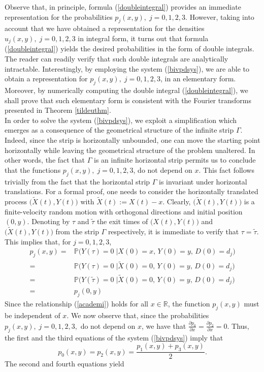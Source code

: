 \documentclass{article}
\begin{document}
Observe that, in principle, formula (\ref{doubleintegral}) provides an immediate representation for the probabilities $p_j(x,y),\;j=0,1,2,3$. However, taking into account that we have obtained a representation for the densities $u_j(x,y),\;j=0,1,2,3$ in integral form, it turns out that formula (\ref{doubleintegral}) yields the desired probabilities in the form of double integrals. The reader can readily verify that such double integrals are analytically intractable. Interestingly, by employing the system (\ref{bivpdsys}), we are able to obtain a representation for $p_j(x,y),\;j=0,1,2,3$, in an elementary form. Moreover, by numerically computing the double integral (\ref{doubleintegral}), we shall prove that such elementary form is consistent with the Fourier transforms presented in Theorem \ref{tildeuthm}.\\
In order to solve the system (\ref{bivpdsys}), we exploit a simplification which emerges as a consequence of the geometrical structure of the infinite strip $\Gamma$. Indeed, since the strip is horizontally unbounded, one can move the starting point horizontally while leaving the geometrical structure of the problem unaltered. In other words, the fact that $\Gamma$ is an infinite horizontal strip permits us to conclude that the functions $p_j(x,y),\;j=0,1,2,3$, do not depend on $x$. This fact follows trivially from the fact that the horizontal strip $\Gamma$ is invariant under horizontal translations. For a formal proof, one needs to consider the horizontally translated process $\big(\widetilde{X}(t), Y(t)\big)$ with $\widetilde{X}(t):=X(t)-x$. Clearly, $\big(\widetilde{X}(t), Y(t)\big)$ is a finite-velocity random motion with orthogonal directions and initial position $(0,y)$. Denoting by $\tau$ and $\widetilde{\tau}$ the exit times of $\big(X(t), Y(t)\big)$ and  $\big(\widetilde{X}(t), Y(t)\big)$ from the strip $\Gamma$ respectively, it is immediate to verify that $\tau=\widetilde{\tau}$. This implies that, for $j=0,1,2,3$,
\begin{align}
p_j(x,y)=&\mathbb{P}\Big(Y(\tau)=0\;\Big\lvert X(0)=x,\,Y(0)=y,\,D(0)=d_j\Big)\nonumber\\
=&\mathbb{P}\Big(Y(\tau)=0\;\Big\lvert \widetilde{X}(0)=0,\,Y(0)=y,\,D(0)=d_j\Big)\nonumber\\
=&\mathbb{P}\Big(Y(\widetilde{\tau})=0\;\Big\lvert \widetilde{X}(0)=0,\,Y(0)=y,\,D(0)=d_j\Big)\nonumber\\
=&p_j(0,y)\label{academi}
\end{align}
Since the relationship (\ref{academi}) holds for all $x\in\mathbb{R}$, the function $p_j(x,y)$ must be independent of $x$. We now observe that, since the probabilities $p_j(x,y),\;j=0,1,2,3,$ do not depend on $x$, we have that $\frac{\partial p_0}{\partial x}=\frac{\partial p_2}{\partial x}=0$. Thus, the first and the third equations of the system (\ref{bivpdsys}) imply that \begin{equation}\label{iside0}p_0(x,y)=p_2(x,y)=\frac{p_1(x,y)+p_3(x,y)}{2}.\end{equation} The second and fourth equations yield
\end{document}
